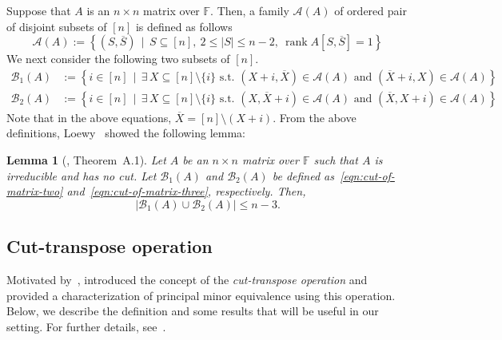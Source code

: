 \documentclass[11pt,letterpaper]{article}
\DeclareMathOperator*{\rank}{rank}
\newcommand{\comp}[1]{\overline{#1}}
\newcommand{\F}{\mathbb{F}}
\newtheorem{lemma}{Lemma}[section]
\newcommand{\nsubset}[1]{[n]\setminus\{#1\}}
\newcommand{\calA}{\mathcal{A}}
\newcommand{\calB}{\mathcal{B}}
\begin{document}
{{{Suppose that $A$ is an $n\times n$ matrix over $\F$. Then, a family $\calA(A)$ of ordered pair of disjoint subsets of $[n]$ is defined as follows
\begin{equation}
\label{eqn:cut-of-matrix-one}
\calA(A):=\left\{(S, \comp{S})\,\mid\, S\subseteq [n],\ 2\leq|S|\leq n-2,\ \rank A[S,\comp{S}]=1\right\}
\end{equation}
We next consider the following two subsets of $[n]$.
\begin{align}
\calB_1(A) &:= \left\{i\in[n] \,\mid\, \exists\, X\subseteq \nsubset{i} \text{ s.t. } (X+i, \comp X)\in \calA(A) \text{ and } (\comp X+i, X)\in\calA(A)\right\}\label{eqn:cut-of-matrix-two}\\
\calB_2(A) &:= \left\{i\in[n] \,\mid\, \exists\, X\subseteq \nsubset{i} \text{ s.t. } (X, \comp X+i)\in \calA(A) \text{ and } (\comp X, X+i)\in\calA(A)\right\}\label{eqn:cut-of-matrix-three}
\end{align}
Note that in the above equations, $\comp{X}=[n]\setminus (X+i)$. From the above definitions, Loewy~\cite{Loewy86} showed the following lemma:
\begin{lemma}[\cite{Loewy86}, Theorem~A.1]
\label{lem:no-cut-property}
Let $A$ be an $n\times n$ matrix over $\F$ such that $A$ is irreducible and has no cut. Let $\calB_1(A)$ and $\calB_2(A)$ be defined as~\cref{eqn:cut-of-matrix-two} and~\cref{eqn:cut-of-matrix-three}, respectively. Then, $$|\calB_1(A)\cup\calB_2(A)|\leq n-3.$$
\end{lemma}


\subsection{Cut-transpose operation} \label{sec: cut transpose}
Motivated by~\cite[Lemma~4.5]{Ahmadieh23}, \cite{Chatterjee25} introduced the concept of the \emph{cut-transpose operation} and provided a characterization of principal minor equivalence using this operation. Below, we describe the definition and some results that will be useful in our setting. For further details, see~\cite[Section~2.5]{Chatterjee25}.   

}}}
\end{document}
